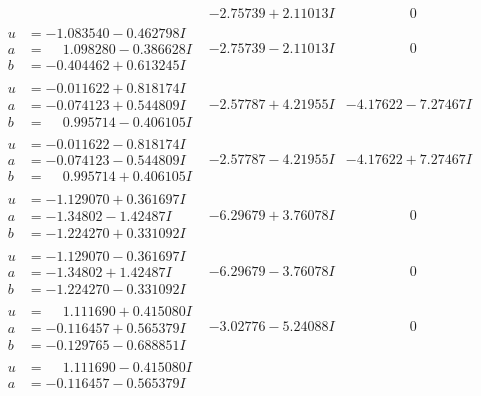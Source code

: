 \documentclass[1p]{elsarticle_modified}
\theoremstyle{definition}
\begin{document}
$$\begin{array}{c|c|c}
 & -2.75739 + 2.11013 I & \phantom{-0.000000 } 0 \\ \hline\begin{aligned}
u &= -1.083540 - 0.462798 I \\
a &= \phantom{-}1.098280 - 0.386628 I \\
b &= -0.404462 + 0.613245 I\end{aligned}
 & -2.75739 - 2.11013 I & \phantom{-0.000000 } 0 \\ \hline\begin{aligned}
u &= -0.011622 + 0.818174 I \\
a &= -0.074123 + 0.544809 I \\
b &= \phantom{-}0.995714 - 0.406105 I\end{aligned}
 & -2.57787 + 4.21955 I & -4.17622 - 7.27467 I \\ \hline\begin{aligned}
u &= -0.011622 - 0.818174 I \\
a &= -0.074123 - 0.544809 I \\
b &= \phantom{-}0.995714 + 0.406105 I\end{aligned}
 & -2.57787 - 4.21955 I & -4.17622 + 7.27467 I \\ \hline\begin{aligned}
u &= -1.129070 + 0.361697 I \\
a &= -1.34802 - 1.42487 I \\
b &= -1.224270 + 0.331092 I\end{aligned}
 & -6.29679 + 3.76078 I & \phantom{-0.000000 } 0 \\ \hline\begin{aligned}
u &= -1.129070 - 0.361697 I \\
a &= -1.34802 + 1.42487 I \\
b &= -1.224270 - 0.331092 I\end{aligned}
 & -6.29679 - 3.76078 I & \phantom{-0.000000 } 0 \\ \hline\begin{aligned}
u &= \phantom{-}1.111690 + 0.415080 I \\
a &= -0.116457 + 0.565379 I \\
b &= -0.129765 - 0.688851 I\end{aligned}
 & -3.02776 - 5.24088 I & \phantom{-0.000000 } 0 \\ \hline\begin{aligned}
u &= \phantom{-}1.111690 - 0.415080 I \\
a &= -0.116457 - 0.565379 I \\

\end{aligned}
\end{array}$$
\end{document}
